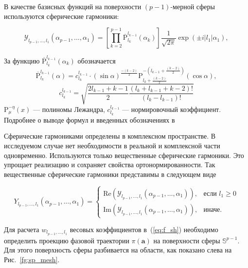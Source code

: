 \documentclass[article,14pt,subf,href,colorlinks=true
]{disser}
\begin{document}
В качестве базисных функций на поверхности $(p-1)$-мерной сферы используются сферические гармоники:

\begin{equation}
	\mathcal{Y}_{l_{p-1},...,l_1}(\alpha_{p-1},\dots,\alpha_1) = 
	\left[
	    \prod\limits_{k = 2}^{p-1}
	    {\overline{\text{P}}}_{l_k}^{l_{k-1}}(\alpha_k)
	\right]
	    \frac{1}{\sqrt{2\pi}}
	    \exp{(\pm i |l_1| \alpha_1)},
\label{eq:YlN}
\end{equation}

За функцию ${\overline{\text{P}}}_{l_k}^{l_{k-1}}(\alpha_k)$ обозначается  
\[
{\overline{\text{P}}}_{l_k}^{l_{k-1}}(\alpha) =
   c^{l_{k-1}}_{l_k} \cdot (\sin \alpha)^{\frac{-(k-2)}{2}}
   \text{P}^{-(l_{k-1}+\frac{(k-2)}{2})}_{l_k+\frac{(k-2)}{2}}(\cos \alpha),
\]
\[
   c^{l_{k-1}}_{l_k} = 
        \sqrt{
	        \frac{2l_{k-1}+k-1}{2}
	        \frac{(l_k+l_{k-1}+k-2)!}{(l_k-l_{k-1})!}
	    }
\]
 $\text{P}_{\mu}^{-\eta}(x)$ --- полиномы Лежандра, $c^{l_{k-1}}_{l_k}$ --- нормировочный коэффициент.
Подробнее о выводе формул и введенных обозначениях в 

Сферические гармониками определены в комплексном пространстве.
В исследуемом случае нет необходимости в реальной и комплексной части одновременно.
Используются только вещественные сферические гармоники.
Это упрощает реализацию и сохраняет свойства ортонормированности.
Так вещественные сферические гармоники представимы в следующем виде

\begin{equation}
	Y_{l_{p-1},...,l_1}(\alpha_{p-1},\dots,\alpha_1) = \begin{cases}
	\text{Re}(\mathcal{Y}_{l_{p-1},...,l_1}(\alpha_{p-1},\dots,\alpha_1)), & \mbox{если } l_1 \geq 0\\
    \text{Im}(\mathcal{Y}_{l_{p-1},...,l_1}(\alpha_{p-1},\dots,\alpha_1)), & \mbox{иначе}.
    \end{cases}
\label{eq:RTY}
\end{equation}

Для расчета $w_{l_{p-1},...,l_1}$ весовых коэффициентов в~(\ref{eq:f_sh}) необходимо определить проекцию фазовой траектории $\pi(\mathbf{a})$ на поверхности сферы $\mathbb{S}^{p-1}$.
Для этого поверхность сферы разбивается на области, как показано слева на Рис.~\ref{fg:sp_mesh}.
\end{document}
